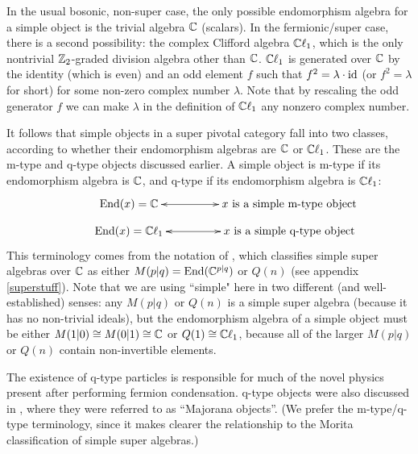 In the usual bosonic, non-super case, the only possible endomorphism algebra for a simple object
is the trivial algebra $\mathbb{C}$ (scalars).
In the fermionic/super case, there is a second possibility: the complex Clifford algebra $\mathbb{C}\ell_1$, 
which is the only nontrivial $\mathbb{Z}_2$-graded division algebra other than $\mathbb{C}$.
$\mathbb{C}\ell_1$ is generated over $\mathbb{C}$ by the identity (which is even) and an odd element $f$ such that $f^2 = \lambda \cdot \text{id}$
(or $f^2 = \lambda$ for short) for some non-zero complex number $\lambda$. 
Note that by rescaling the odd generator $f$ we can make $\lambda$ in the definition of $\mathbb{C}\ell_1$ any nonzero complex number. 

It follows that simple objects in a super pivotal category fall into two classes, according to whether their endomorphism algebras are $\mathbb{C}$ or $\mathbb{C}\ell_1$. 
These are the m-type and q-type objects discussed earlier. 
A simple object is {m-type} if its endomorphism algebra
is $\mathbb{C}$, and {q-type} if its endomorphism algebra is $\mathbb{C}\ell_1$:
\begin{align}
\vcenter{\xymatrix @!0 @M=1mm @C=25mm{
& \text{End}(x) = \mathbb{C} \ar@{<->}[rr] &   &\text{$x$ is a simple m-type object}&  \\
&\text{End}(x) = \mathbb{C} \ell_1 \ar@{<->}[rr]  &  &\text{$x$ is a simple q-type object}&
	}}
\end{align}
This terminology comes from the notation of \cite{jozefiak1988}, which classifies simple super algebras over $\mathbb{C}$ as either
$M(p|q) = \text{End}(\mathbb{C}^{p|q})$ or $Q(n)$ (see appendix \ref{superstuff}).
Note that we are using ``simple" here in two different (and well-established) senses: 
any $M(p|q)$ or $Q(n)$ is a simple super algebra
(because it has no non-trivial ideals), but the endomorphism algebra of a simple object must be either
$M(1|0) \cong M(0|1) \cong \mathbb{C}$ or $Q(1) \cong \mathbb{C}\ell_1$,
because all of the larger $M(p|q)$ or $Q(n)$ contain non-invertible elements.

The existence of q-type particles is responsible for much of the novel physics present after performing fermion condensation. 
q-type objects were also discussed in \cite{usher2016,gaiotto2016}, where they were referred to as ``Majorana objects''. 
(We prefer the m-type/q-type terminology, since it makes clearer the relationship to the Morita classification of 
simple super algebras.)



